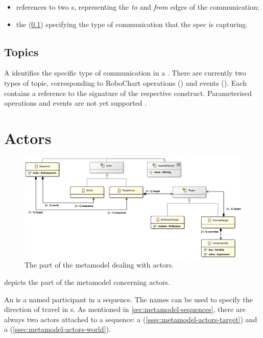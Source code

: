 \begin{itemize}
\item
	references to two \mactor s, representing the \emph{to} and \emph{from}
	edges of the communication;
\item
	the \mmessagetopic{} (\cref{ssec:metamodel-messages-topics}) specifying
	the type of communication that the spec is capturing.
\end{itemize}

\subsection{Topics}\label{ssec:metamodel-messages-topics}

A \mmessagetopic{} identifies the specific type of communication in a
\mmessagespec{}.  There are currently two types of topic, corresponding to
RoboChart operations (\moperationmessagetopic) and events (\meventmessagetopic).
Each contains a reference to the signature of the respective construct.
Parameterised operations and events are not yet supported .


\section{Actors}\label{sec:metamodel-actors}

\begin{figure}
	\centering
	\includegraphics[width=\textwidth]{diagrams/actors.png}
	\caption{The part of the \langname{} metamodel dealing with actors.}
	\label{fig:metamodel-actors}
\end{figure}

 depicts the part of the metamodel concerning
actors.

An \mactor{} is a named participant in a sequence.  The names can be used to
specify the direction of travel in \mmessagespec{}s.
As mentioned in
\cref{sec:metamodel-sequences}, there are always two actors
attached to a sequence: a \mtargetactor{} (\cref{ssec:metamodel-actors-target})
and a \mworld{} (\cref{ssec:metamodel-actors-world}).

